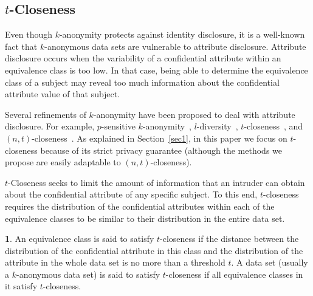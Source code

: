 \documentclass[10pt,journal,compsoc]{IEEEtran}
\theoremstyle{definition}
\newtheorem{defn}{\protect\definitionname}
\theoremstyle{plain}
\providecommand{\definitionname}{Definition}
\begin{document}
\subsection{$t$-Closeness}

Even though $k$-anonymity protects against identity disclosure, 
it is a well-known fact that $k$-anonymous data sets are vulnerable
to attribute disclosure. Attribute disclosure occurs when the variability
of a confidential attribute within an equivalence class is too low.
In that case, being able to determine the equivalence class of a subject 
may reveal too much information about the
confidential attribute value of that subject.

Several refinements of $k$-anonymity have been proposed to deal
with attribute disclosure. For example, $p$-sensitive $k$-anonymity~\cite{Truta2006pSensitive},
$l$-diversity~\cite{Machanavajjhala2007lDiversity}, $t$-closeness~\cite{Li2007t-Closeness},
and $(n,t)$-closeness~\cite{Li2010Closeness}. As explained
in Section~\ref{sec1}, in this paper we
focus on $t$-closeness because of its strict privacy guarantee 
(although the methods we propose are easily
adaptable to $(n,t)$-closeness). 

$t$-Closeness seeks to limit the amount of information that
an intruder can obtain about the
confidential attribute of any specific subject. 
To this end, $t$-closeness requires 
the distribution of the confidential
attributes within each of the equivalence classes 
to be similar to their distribution
in the entire data set. 
\begin{defn}
	An equivalence class is said to satisfy $t$-closeness if the distance
	between the distribution of the confidential attribute in this class
	and the distribution of the attribute in the whole data set is no more
	than a threshold $t$. A data set (usually 
a $k$-anonymous data set) is said to satisfy $t$-closeness if all
	equivalence classes in it satisfy $t$-closeness.
\end{defn}
\end{document}
